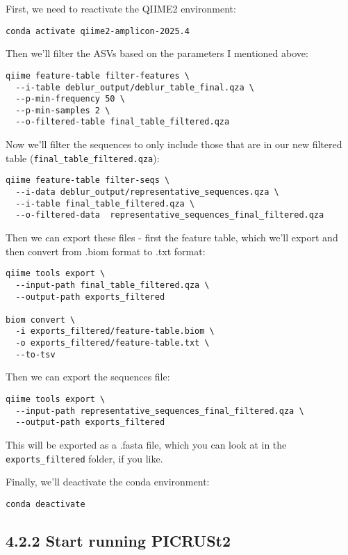 \documentclass[
]{book}
\begin{document}
First, we need to reactivate the QIIME2 environment:

\begin{verbatim}
conda activate qiime2-amplicon-2025.4
\end{verbatim}

Then we'll filter the ASVs based on the parameters I mentioned above:

\begin{verbatim}
qiime feature-table filter-features \
  --i-table deblur_output/deblur_table_final.qza \
  --p-min-frequency 50 \
  --p-min-samples 2 \
  --o-filtered-table final_table_filtered.qza
\end{verbatim}

Now we'll filter the sequences to only include those that are in our new filtered table (\texttt{final\_table\_filtered.qza}):

\begin{verbatim}
qiime feature-table filter-seqs \
  --i-data deblur_output/representative_sequences.qza \
  --i-table final_table_filtered.qza \
  --o-filtered-data  representative_sequences_final_filtered.qza
\end{verbatim}

Then we can export these files - first the feature table, which we'll export and then convert from .biom format to .txt format:

\begin{verbatim}
qiime tools export \
  --input-path final_table_filtered.qza \
  --output-path exports_filtered
  
biom convert \
  -i exports_filtered/feature-table.biom \
  -o exports_filtered/feature-table.txt \
  --to-tsv 
\end{verbatim}

Then we can export the sequences file:

\begin{verbatim}
qiime tools export \
  --input-path representative_sequences_final_filtered.qza \
  --output-path exports_filtered
\end{verbatim}

This will be exported as a .fasta file, which you can look at in the \texttt{exports\_filtered} folder, if you like.

Finally, we'll deactivate the conda environment:

\begin{verbatim}
conda deactivate
\end{verbatim}

\subsection{4.2.2 Start running PICRUSt2}\label{start-running-picrust2}
\end{document}
